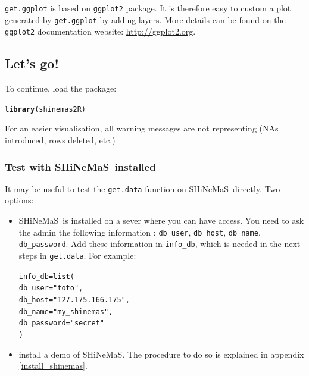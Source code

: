 \documentclass{article}\usepackage[]{graphicx}\usepackage[]{color}
\makeatletter
\newcommand{\hlstr}[1]{\textcolor[rgb]{0.192,0.494,0.8}{#1}}%
\newcommand{\hlstd}[1]{\textcolor[rgb]{0.345,0.345,0.345}{#1}}%
\newcommand{\hlkwb}[1]{\textcolor[rgb]{0.69,0.353,0.396}{#1}}%
\newcommand{\hlkwc}[1]{\textcolor[rgb]{0.333,0.667,0.333}{#1}}%
\newcommand{\hlkwd}[1]{\textcolor[rgb]{0.737,0.353,0.396}{\textbf{#1}}}%
\newenvironment{kframe}{%
 \def\at@end@of@kframe{}%
 \ifinner\ifhmode%
  \def\at@end@of@kframe{\end{minipage}}%
  \begin{minipage}{\columnwidth}%
 \fi\fi%
 \def\FrameCommand##1{\hskip\@totalleftmargin \hskip-\fboxsep
 \colorbox{shadecolor}{##1}\hskip-\fboxsep
     \hskip-\linewidth \hskip-\@totalleftmargin \hskip\columnwidth}%
 \MakeFramed {\advance\hsize-\width
   \@totalleftmargin\z@ \linewidth\hsize
   \@setminipage}}%
 {\par\unskip\endMakeFramed%
 \at@end@of@kframe}
\newenvironment{knitrout}{}{} %
\newcommand{\BD}{SHiNeMaS}
\makeatother
\begin{document}
\texttt{get.ggplot} is based on \texttt{ggplot2} package.
It is therefore easy to custom a plot generated by \texttt{get.ggplot} by adding layers.
More details can be found on the \texttt{ggplot2} documentation website: \url{http://ggplot2.org}.

\subsection{Let’s go!}

To continue, load the package:
\begin{knitrout}
\color{fgcolor}\begin{kframe}
\begin{alltt}
\hlkwd{library}\hlstd{(shinemas2R)}
\end{alltt}
\end{kframe}
\end{knitrout}

For an easier visualisation, all warning messages are not representing (NAs introduced, rows deleted, etc.)

\subsubsection{Test with \BD~installed}

It may be useful to test the \texttt{get.data} function on \BD~directly.
Two options:
\begin{itemize}
\item \BD~is installed on a sever where you can have access. 
You need to ask the admin the following information : \texttt{db\_user}, \texttt{db\_host}, \texttt{db\_name}, \texttt{db\_password}. 
Add these information in \texttt{info\_db}, which is needed in the next steps in \texttt{get.data}.
For example: 

\begin{knitrout}
\color{fgcolor}\begin{kframe}
\begin{alltt}
\hlstd{info_db} \hlkwb{=} \hlkwd{list}\hlstd{(}
        \hlkwc{db_user} \hlstd{=} \hlstr{"toto"}\hlstd{,}
        \hlkwc{db_host} \hlstd{=} \hlstr{"127.175.166.175"}\hlstd{,}
        \hlkwc{db_name} \hlstd{=} \hlstr{"my_shinemas"}\hlstd{,}
        \hlkwc{db_password} \hlstd{=} \hlstr{"secret"}
        \hlstd{)}
\end{alltt}
\end{kframe}
\end{knitrout}

\item install a demo of \BD.
The procedure to do so is explained in appendix \ref{install_shinemas}.

\end{itemize}
\end{document}
